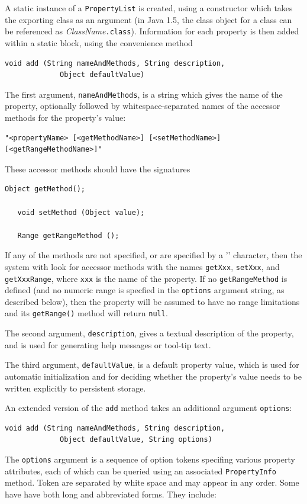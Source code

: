 \documentclass{article}
\begin{document}
A static instance of a {\tt PropertyList} is created, using a
constructor which takes the exporting class as an argument (in Java
1.5, the class object for a class can be referenced as 
{\it ClassName}{\tt .class}). Information for each property is
then added within a static block, using the convenience method
\begin{lstlisting}[]
   void add (String nameAndMethods, String description, 
             Object defaultValue)    
\end{lstlisting}
The first argument, {\tt nameAndMethods}, is a string which gives the
name of the property, optionally followed by
whitespace-separated names of the accessor methods for
the property's value:
\begin{lstlisting}[]
   "<propertyName> [<getMethodName>] [<setMethodName>] [<getRangeMethodName>]"    
\end{lstlisting}
These accessor methods should have the
signatures
\begin{lstlisting}[]
   Object getMethod();

   void setMethod (Object value);

   Range getRangeMethod ();
\end{lstlisting}

If any of the methods are not specified, or are specified by a '{\tt *}'
character, then the system with look for accessor methods with the
names {\tt getXxx}, {\tt setXxx}, and {\tt getXxxRange},
where {\tt xxx} is the name
of the property. If no {\tt getRangeMethod} is defined (and no numeric
range is specfied in the {\tt options} argument string, as described
below), then the property will be assumed to have no range limitations
and its {\tt getRange()} method will return {\tt null}.

The second argument, {\tt description}, gives a textual description of
the property, and is used for generating help messages or tool-tip
text.

The third argument, {\tt defaultValue}, is a default property value,
which is used for automatic initialization and for deciding whether
the property's value needs to be written explicitly to persistent
storage.

An extended version of the {\tt add} method takes an additional
argument {\tt options}:
\begin{lstlisting}[]
   void add (String nameAndMethods, String description, 
             Object defaultValue, String options)
\end{lstlisting}
The {\tt options} argument is a sequence of option tokens specifing
various property attributes, each of which can be queried using an
associated {\tt PropertyInfo} method.  Token are separated by white
space and may appear in any order. Some have have both long and
abbreviated forms.  They include:
\end{document}
